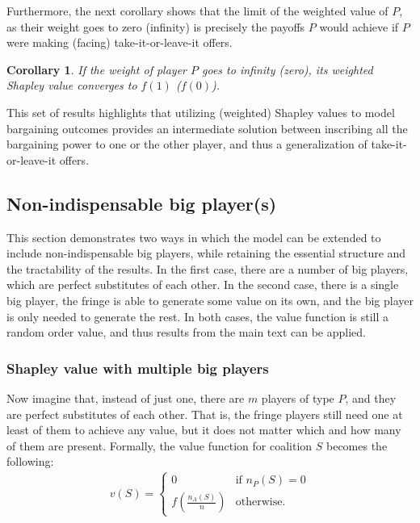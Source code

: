 \documentclass[a4paper]{article}
\newtheorem{corollary}{Corollary}
\begin{document}
Furthermore, the next corollary shows that the limit of the weighted value of $P$, as their weight goes to zero (infinity) is precisely the payoffs $P$ would achieve if $P$ were making (facing) take-it-or-leave-it offers.
\begin{corollary}
    \label{cor:paltform_value_weighted_2}
    If the weight of player $P$ goes to infinity (zero), its weighted Shapley value converges to $f(1)$ ($f(0)$).
\end{corollary}
This set of results highlights that utilizing (weighted) Shapley values to model bargaining outcomes provides an intermediate solution between inscribing all the bargaining power to one or the other player, and thus a generalization of take-it-or-leave-it offers.



\subsection{Non-indispensable big player(s)}
\label{sec:extensions}

This section demonstrates two ways in which the model can be extended to include non-indispensable big players, while retaining the essential structure and the tractability of the results.
In the first case, there are a number of big players, which are perfect substitutes of each other.
In the second case, there is a single big player, the fringe is able to generate some value on its own, and the big player is only needed to generate the rest.
In both cases, the value function is still a random order value, and thus results from the main text can be applied.

\subsubsection{Shapley value with multiple big players}

Now imagine that, instead of just one, there are $m$ players of type $P$, and they are perfect substitutes of each other.
That is, the fringe players still need one at least of them to achieve any value, but it does not matter which and how many of them are present.
Formally, the value function for coalition $S$ becomes the following:
\begin{align*}
    v(S) = \begin{cases}
        0                              & \text{if } n_P(S) = 0 \\
        f\left(\frac{n_A(S)}{n}\right) & \text{otherwise}.
    \end{cases}
\end{align*}
\end{document}

